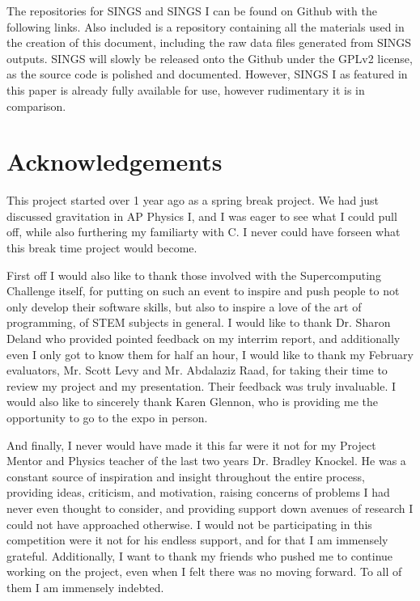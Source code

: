 \documentclass[12pt, twoside, letterpaper]{article}
\begin{document}
The repositories for SINGS and SINGS I can be found on Github with the following links. Also included is a repository containing all the materials used in the creation of this document, including the raw data files generated from SINGS outputs. SINGS will slowly be released onto the Github under the GPLv2 license, as the source code is polished and documented. However, SINGS I as featured in this paper is already fully available for use, however rudimentary it is in comparison.
\vspace{0.2cm}

\noindent {}  \href{https://github.com/CodingKraken/SINGS}{} 

\noindent {} \href{https://github.com/CodingKraken/SINGS-I}{}

\noindent {}  \href{https://github.com/CodingKraken/SCC-SINGS-Paper}{}

\section*{Acknowledgements} \label{sec:acknowledge}
This project started over 1 year ago as a spring break project. We had just discussed gravitation in AP Physics I, and I was eager to see what I could pull off, while also furthering my familiarty with C. I never could have forseen what this break time project would become.

First off I would also like to thank those involved with the Supercomputing Challenge itself, for putting on such an event to inspire and push people to not only develop their software skills, but also to inspire a love of the art of programming, of STEM subjects in general. I would like to thank Dr. Sharon Deland who provided pointed feedback on my interrim report, and additionally even I only got to know them for half an hour, I would like to thank my February evaluators, Mr. Scott Levy and Mr. Abdalaziz Raad, for taking their time to review my project and my presentation. Their feedback was truly invaluable. I would also like to sincerely thank Karen Glennon, who is providing me the opportunity to go to the expo in person.

And finally, I never would have made it this far were it not for my Project Mentor and Physics teacher of the last two years Dr. Bradley Knockel. He was a constant source of inspiration and insight throughout the entire process, providing ideas, criticism, and motivation, raising concerns of problems I had never even thought to consider, and providing support down avenues of research I could not have approached otherwise. I would not be participating in this competition were it not for his endless support, and for that I am immensely grateful. Additionally, I want to thank my friends who pushed me to continue working on the project, even when I felt there was no moving forward. To all of them I am immensely indebted.

\printbibliography
\end{document}
